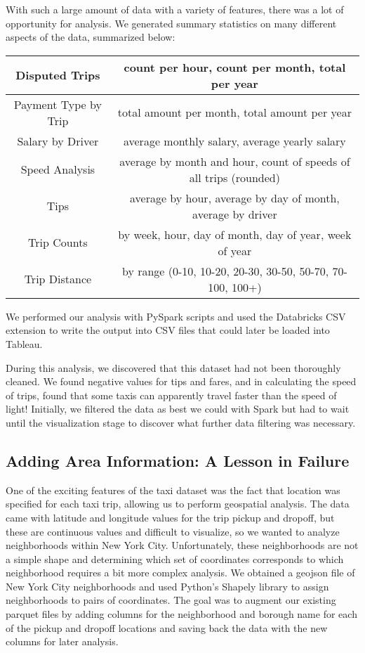 \documentclass[11pt]{article} %
\begin{document}
With such a large amount of data with a variety of features, there was a lot of opportunity for analysis. We generated summary statistics on many different aspects of the data, summarized below:

 \begin{table}
	\centering
        \begin{tabular}{|c|c|}
        \hline
 	Disputed Trips & count per hour, count per month, total per year \\
  	\hline
	Payment Type by Trip & total amount per month, total amount per year \\
	\hline
	Salary by Driver & average monthly salary, average yearly salary \\
	\hline
	Speed Analysis & average by month and hour, count of speeds of all trips (rounded) \\
	\hline
	Tips & average by hour, average by day of month, average by driver \\
	\hline
	Trip Counts & by week, hour, day of month, day of year, week of year \\
	\hline
	Trip Distance & by range (0-10, 10-20, 20-30, 30-50, 50-70, 70-100, 100+) \\
	\hline
        \end{tabular}
\end{table}

We performed our analysis with PySpark scripts and used the Databricks CSV extension to write the output into CSV files that could later be loaded into Tableau. 

During this analysis, we discovered that this dataset had not been thoroughly cleaned. We found negative values for tips and fares, and in calculating the speed of trips, found that some taxis can apparently travel faster than the speed of light! Initially, we filtered the data as best we could with Spark but had to wait until the visualization stage to discover what further data filtering was necessary.


\subsection{Adding Area Information: A Lesson in Failure}

One of the exciting features of the taxi dataset was the fact that location was specified for each taxi trip, allowing us to perform geospatial analysis. The data came with latitude and longitude values for the trip pickup and dropoff, but these are continuous values and difficult to visualize, so we wanted to analyze neighborhoods within New York City. Unfortunately, these neighborhoods are not a simple shape and determining which set of coordinates corresponds to which neighborhood requires a bit more complex analysis. We obtained a geojson file\cite{geojson} of New York City neighborhoods and used Python’s Shapely library\cite{shapely} to assign neighborhoods to pairs of coordinates. The goal was to augment our existing parquet files by adding columns for the neighborhood and borough name for each of the pickup and dropoff locations and saving back the data with the new columns for later analysis.
\end{document}
